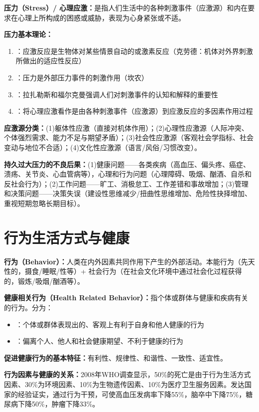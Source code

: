 \begin{keybox}
\textbf{压力（Stress）/ 心理应激：}是指人们生活中的各种刺激事件（应激源）和内在要求在心理上所构成的困惑或威胁，表现为心身紧张或不适。

\textbf{压力基本理论：}
\begin{enumerate}[leftmargin=*]
    \item {}：应激反应是生物体对某些情景自动的或激素反应（克劳德：机体对外界刺激所做出的适应性反应）
    \item {}：压力是外部压力事件的刺激作用（坎农）
    \item {}：拉扎勒斯和福尔克曼强调人们对刺激事件的认知和解释的重要性
    \item {}：将心理应激看作是由各种刺激事件（应激源）到应激反应的多因素作用过程
\end{enumerate}

\textbf{应激源分类：}(1)躯体性应激（直接对机体作用）；(2)心理性应激源（人际冲突、个体强烈需求、能力不足与期望矛盾）；(3)社会性应激源（客观社会学指标、社会变动与地位不合适）；(4)文化性应激源（语言/风俗/习惯改变）。

\textbf{持久过大压力的不良后果：}(1)健康问题——各类疾病（高血压、偏头疼、癌症、溃疡、关节炎、心血管病等），心理和行为问题（心理障碍、吸烟、酗酒、自杀和反社会行为）；(2)工作问题——旷工、消极怠工、工作差错和事故增加；(3)管理和决策问题——决策失误（建设性思维减少/扭曲性思维增加、危险性抉择增加、重视短期忽略长期目标）。
\end{keybox}

\section{行为生活方式与健康}

\begin{keybox}
\textbf{行为（Behavior）：}人类在内外因素共同作用下产生的外部活动。本能行为（先天性的，摄食/睡眠/性等）+ 社会行为（在社会文化环境中通过社会化过程获得的，锻炼/吸烟/酗酒等）。

\textbf{健康相关行为（Health Related Behavior）：}指个体或群体与健康和疾病有关的行为。分为：
\begin{itemize}[leftmargin=*]
    \item {}：个体或群体表现出的、客观上有利于自身和他人健康的行为
    \item {}：偏离个人、他人和社会健康期望、不利于健康的行为
\end{itemize}

\textbf{促进健康行为的基本特征：}有利性、规律性、和谐性、一致性、适宜性。

\textbf{行为因素与健康的关系：}2008年WHO调查显示，50\%的死亡是由于行为生活方式因素、30\%为环境因素、10\%为生物遗传因素、10\%为医疗卫生服务因素。发达国家的经验证实，通过行为干预，可使高血压发病率下降55\%，脑卒中下降75\%，糖尿病下降50\%，肿瘤下降33\%。
\end{keybox}

